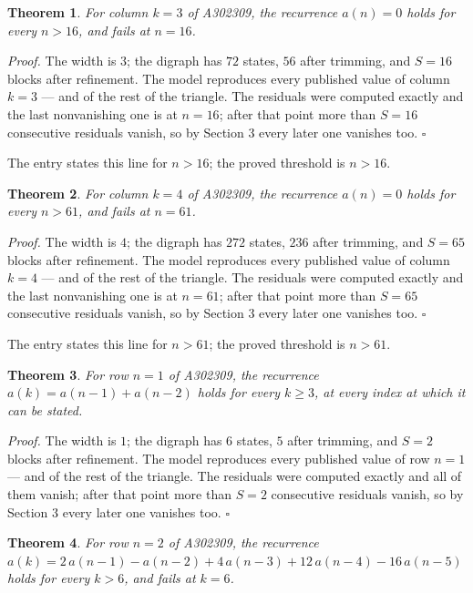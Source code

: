 \documentclass[11pt]{article}
\newtheorem{theorem}{Theorem}
\theoremstyle{definition}
\begin{document}
\begin{theorem} For column $k = 3$ of A302309, the recurrence $a(n) = 0$ holds for every $n > 16$, and fails at $n = 16$.\end{theorem}

{\itshape Proof.} The width is $3$; the digraph has $72$ states, $56$ after trimming, and $S = 16$ blocks after refinement. The model reproduces every published value of column $k = 3$ --- and of the rest of the triangle. The residuals were computed exactly and the last nonvanishing one is at $n = 16$; after that point more than $S = 16$ consecutive residuals vanish, so by Section 3 every later one vanishes too. $\square$

The entry states this line for $n > 16$; the proved threshold is $n > 16$.

\begin{theorem} For column $k = 4$ of A302309, the recurrence $a(n) = 0$ holds for every $n > 61$, and fails at $n = 61$.\end{theorem}

{\itshape Proof.} The width is $4$; the digraph has $272$ states, $236$ after trimming, and $S = 65$ blocks after refinement. The model reproduces every published value of column $k = 4$ --- and of the rest of the triangle. The residuals were computed exactly and the last nonvanishing one is at $n = 61$; after that point more than $S = 65$ consecutive residuals vanish, so by Section 3 every later one vanishes too. $\square$

The entry states this line for $n > 61$; the proved threshold is $n > 61$.

\begin{theorem} For row $n = 1$ of A302309, the recurrence $a(k) = a(n-1) + a(n-2)$ holds for every $k \ge 3$, at every index at which it can be stated.\end{theorem}

{\itshape Proof.} The width is $1$; the digraph has $6$ states, $5$ after trimming, and $S = 2$ blocks after refinement. The model reproduces every published value of row $n = 1$ --- and of the rest of the triangle. The residuals were computed exactly and all of them vanish; after that point more than $S = 2$ consecutive residuals vanish, so by Section 3 every later one vanishes too. $\square$

\begin{theorem} For row $n = 2$ of A302309, the recurrence $a(k) = 2\,a(n-1) - a(n-2) + 4\,a(n-3) + 12\,a(n-4) - 16\,a(n-5)$ holds for every $k > 6$, and fails at $k = 6$.\end{theorem}
\end{document}

